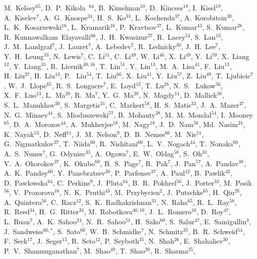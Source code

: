 {M.~Kelsey$^{65}$,
D.~P.~Kiko\l{}a~$^{64}$,
B.~Kimelman$^{10}$,
D.~Kincses$^{18}$,
I.~Kisel$^{19}$,
A.~Kiselev$^{7}$,
A.~G.~Knospe$^{34}$,
H.~S.~Ko$^{33}$,
L.~Kochenda$^{37}$,
A.~Korobitsin$^{30}$,
L.~K.~Kosarzewski$^{16}$,
L.~Kramarik$^{16}$,
P.~Kravtsov$^{37}$,
L.~Kumar$^{43}$,
S.~Kumar$^{28}$,
R.~Kunnawalkam~Elayavalli$^{66}$,
J.~H.~Kwasizur$^{27}$,
R.~Lacey$^{54}$,
S.~Lan$^{13}$,
J.~M.~Landgraf$^{7}$,
J.~Lauret$^{7}$,
A.~Lebedev$^{7}$,
R.~Lednicky$^{30}$,
J.~H.~Lee$^{7}$,
Y.~H.~Leung$^{33}$,
N.~Lewis$^{7}$,
C.~Li$^{51}$,
C.~Li$^{49}$,
W.~Li$^{46}$,
X.~Li$^{49}$,
Y.~Li$^{59}$,
X.~Liang$^{12}$,
Y.~Liang$^{31}$,
R.~Licenik$^{40,16}$,
T.~Lin$^{51}$,
Y.~Lin$^{13}$,
M.~A.~Lisa$^{41}$,
F.~Liu$^{13}$,
H.~Liu$^{27}$,
H.~Liu$^{13}$,
P.~ Liu$^{54}$,
T.~Liu$^{66}$,
X.~Liu$^{41}$,
Y.~Liu$^{57}$,
Z.~Liu$^{49}$,
T.~Ljubicic$^{7}$,
W.~J.~Llope$^{65}$,
R.~S.~Longacre$^{7}$,
E.~Loyd$^{12}$,
T.~Lu$^{28}$,
N.~S.~ Lukow$^{56}$,
X.~F.~Luo$^{13}$,
L.~Ma$^{20}$,
R.~Ma$^{7}$,
Y.~G.~Ma$^{20}$,
N.~Magdy$^{14}$,
D.~Mallick$^{38}$,
S.~L.~Manukhov$^{30}$,
S.~Margetis$^{31}$,
C.~Markert$^{58}$,
H.~S.~Matis$^{33}$,
J.~A.~Mazer$^{47}$,
N.~G.~Minaev$^{44}$,
S.~Mioduszewski$^{57}$,
B.~Mohanty$^{38}$,
M.~M.~Mondal$^{54}$,
I.~Mooney$^{65}$,
D.~A.~Morozov$^{44}$,
A.~Mukherjee$^{18}$,
M.~Nagy$^{18}$,
J.~D.~Nam$^{56}$,
Md.~Nasim$^{24}$,
K.~Nayak$^{13}$,
D.~Neff$^{11}$,
J.~M.~Nelson$^{9}$,
D.~B.~Nemes$^{66}$,
M.~Nie$^{51}$,
G.~Nigmatkulov$^{37}$,
T.~Niida$^{60}$,
R.~Nishitani$^{60}$,
L.~V.~Nogach$^{44}$,
T.~Nonaka$^{60}$,
A.~S.~Nunes$^{7}$,
G.~Odyniec$^{33}$,
A.~Ogawa$^{7}$,
E.~W.~Oldag$^{58}$,
S.~Oh$^{33}$,
V.~A.~Okorokov$^{37}$,
K.~Okubo$^{60}$,
B.~S.~Page$^{7}$,
R.~Pak$^{7}$,
J.~Pan$^{57}$,
A.~Pandav$^{38}$,
A.~K.~Pandey$^{60}$,
Y.~Panebratsev$^{30}$,
P.~Parfenov$^{37}$,
A.~Paul$^{12}$,
B.~Pawlik$^{42}$,
D.~Pawlowska$^{64}$,
C.~Perkins$^{9}$,
J.~Pluta$^{64}$,
B.~R.~Pokhrel$^{56}$,
J.~Porter$^{33}$,
M.~Posik$^{56}$,
V.~Prozorova$^{16}$,
N.~K.~Pruthi$^{43}$,
M.~Przybycien$^{2}$,
J.~Putschke$^{65}$,
H.~Qiu$^{28}$,
A.~Quintero$^{56}$,
C.~Racz$^{12}$,
S.~K.~Radhakrishnan$^{31}$,
N.~Raha$^{65}$,
R.~L.~Ray$^{58}$,
R.~Reed$^{34}$,
H.~G.~Ritter$^{33}$,
M.~Robotkova$^{40,16}$,
J.~L.~Romero$^{10}$,
D.~Roy$^{47}$,
L.~Ruan$^{7}$,
A.~K.~Sahoo$^{24}$,
N.~R.~Sahoo$^{51}$,
H.~Sako$^{60}$,
S.~Salur$^{47}$,
E.~Samigullin$^{3}$,
J.~Sandweiss$^{66,*}$,
S.~Sato$^{60}$,
W.~B.~Schmidke$^{7}$,
N.~Schmitz$^{35}$,
B.~R.~Schweid$^{54}$,
F.~Seck$^{17}$,
J.~Seger$^{15}$,
R.~Seto$^{12}$,
P.~Seyboth$^{35}$,
N.~Shah$^{26}$,
E.~Shahaliev$^{30}$,
P.~V.~Shanmuganathan$^{7}$,
M.~Shao$^{49}$,
T.~Shao$^{20}$,
R.~Sharma$^{25}$,
}
